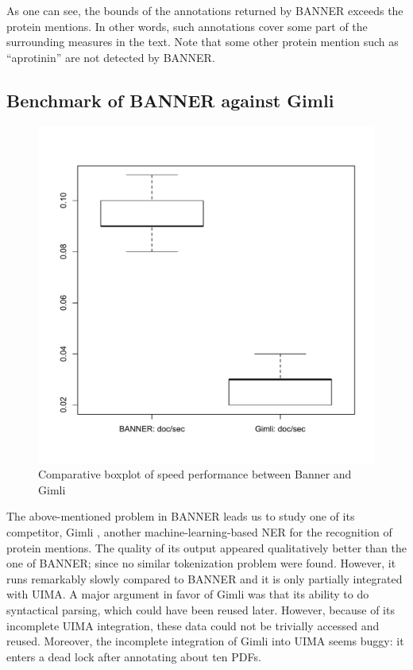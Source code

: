 \documentclass{report}
\begin{document}
                        As one can see, the bounds of the annotations returned by BANNER exceeds the protein mentions. 
                        In other words, such annotations cover
                        some part of the surrounding measures in the text. Note that some other protein mention such as ``aprotinin'' are not detected by
                        BANNER. 
					\subsection{Benchmark of BANNER against Gimli}
					
                    \begin{figure}[h]
						\centering
						\includegraphics[width=\textwidth]{fig/banner_gimli_bm_docs.pdf}
						\caption{Comparative boxplot of speed performance between Banner and Gimli}
						\label{fig:doc_per_sec}
					\end{figure}
					
                                        
                    The above-mentioned problem in BANNER leads us to study one 
                    of its competitor, Gimli \cite{gimli}, another machine-learning-based NER for the recognition of protein mentions.
                    The quality of its
					output appeared qualitatively better than the one of BANNER; 
					since no similar tokenization problem were 
					found. However, it runs
					remarkably slowly compared to BANNER and it is only partially 
					integrated with UIMA. A major argument in favor of Gimli
					was that its ability to do syntactical parsing, 
					which could have been reused later. However, because of its
					incomplete UIMA integration, these data could not be trivially accessed and reused. 
					Moreover, the incomplete integration of Gimli into UIMA seems buggy: it enters a dead lock
					after annotating about ten PDFs.
					
\end{document}
